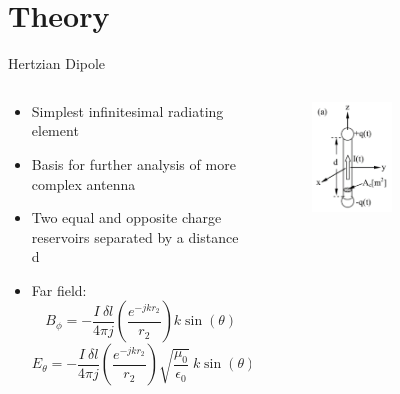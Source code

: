 \documentclass{beamer}
\begin{document}
\section{Theory}
\begin{frame}{Hertzian Dipole}
\begin{columns}[T]
    \begin{column}{.7\textwidth}
\begin{itemize} 
\item Simplest infinitesimal radiating element
\item Basis for further analysis of more complex antenna
\item Two equal and opposite charge  reservoirs separated by
a distance d 
\item Far field:
\begin{equation*}
B_{\phi} = - \frac{I \: \delta l}{4 \pi j} \left( \frac{e^{-j k r_2}}{r_2} \right) k \sin{(\theta)}
\end{equation*}
\begin{equation*}
E_{\theta} = - \frac{I \: \delta l}{4 \pi j} \left( \frac{e^{-j k r_2}}{r_2} \right) \sqrt{\frac{\mu_0}{\epsilon_0}} \: k \sin{(\theta)}
\end{equation*}
\end{itemize}
    \end{column}
    \begin{column}{.5\textwidth}    
\begin{figure}
\includegraphics[width=0.5\textwidth]{Hert.png}
\cite{hert}
\end{figure}
    
    \end{column}
  \end{columns}
\end{frame}
\end{document}
